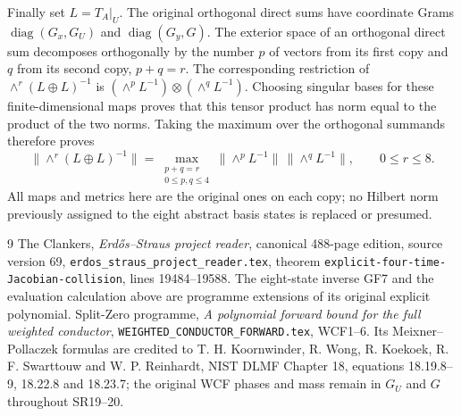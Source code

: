 \documentclass[11pt]{article}
\newcommand{\diag}{\operatorname{diag}}
\begin{document}
Finally set $L=T_A|_U$. The original orthogonal direct sums
have coordinate Grams $\diag(G_x,G_U)$ and $\diag(G_y,G)$.
The exterior space of an orthogonal direct sum decomposes
orthogonally by the number $p$ of vectors from its first
copy and $q$ from its second copy, $p+q=r$. The corresponding
restriction of $\wedge^r(L\oplus L)^{-1}$ is
$(\wedge^pL^{-1})\otimes(\wedge^qL^{-1})$.
Choosing singular bases for these finite-dimensional maps
proves that this tensor product has norm equal to the product
of the two norms. Taking the maximum over the orthogonal
summands therefore proves
\[
 \|\wedge^r(L\oplus L)^{-1}\|
 =\max_{\substack{p+q=r\\0\le p,q\le4}}
       \|\wedge^pL^{-1}\|\,\|\wedge^qL^{-1}\|,
 \qquad 0\le r\le8.
 \tag{SR23}
\]
All maps and metrics here are the original ones on each copy;
no Hilbert norm previously assigned to the eight abstract
basis states is replaced or presumed.

\begin{thebibliography}{9}
 The Clankers, \emph{Erd\H{o}s--Straus project reader},
canonical 488-page edition, source version 69,
\texttt{erdos\_straus\_project\_reader.tex}, theorem
\texttt{explicit-four-time-Jacobian-collision}, lines 19484--19588.
The eight-state inverse GF7 and the evaluation calculation above
are programme extensions of its original explicit polynomial.
 Split-Zero programme, \emph{A polynomial forward
bound for the full weighted conductor},
\texttt{WEIGHTED\_CONDUCTOR\_FORWARD.tex}, WCF1--6.
Its Meixner--Pollaczek formulas are credited to
T. H. Koornwinder, R. Wong, R. Koekoek, R. F. Swarttouw and
W. P. Reinhardt, NIST DLMF Chapter 18, equations 18.19.8--9,
18.22.8 and 18.23.7; the original WCF phases and mass remain
in $G_U$ and $G$ throughout SR19--20.
\end{thebibliography}
\end{document}
